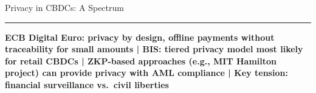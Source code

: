 \documentclass[8pt,aspectratio=169]{beamer}
\newcommand{\bottomnote}[1]{\vfill\vspace{-2mm}\textcolor{mllavender2}{\rule{\textwidth}{0.4pt}}\vspace{1mm}\footnotesize\textbf{#1}}
\begin{document}
\begin{frame}{Privacy in CBDCs: A Spectrum}
\bottomnote{ECB Digital Euro: privacy by design, offline payments without traceability for small amounts | BIS: tiered privacy model most likely for retail CBDCs | ZKP-based approaches (e.g., MIT Hamilton project) can provide privacy with AML compliance | Key tension: financial surveillance vs.\ civil liberties}
\end{frame}
\end{document}
